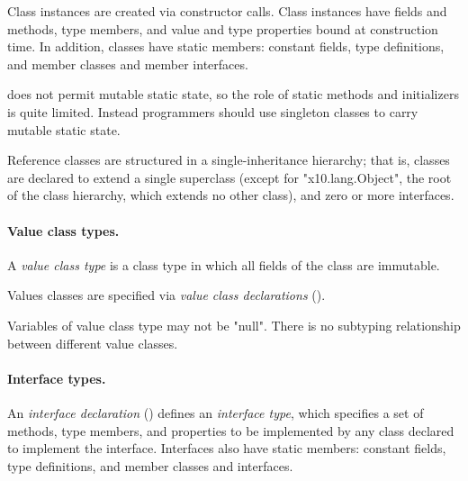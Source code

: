         Class instances are created via
        constructor calls.  Class instances have fields and
        methods, type members, and value and type properties bound at
        construction time.  In addition, classes have static
        members: constant fields, type definitions, and member
        classes and member interfaces.

\Xten{} does
not
permit mutable static state, so the role of static methods and
initializers is quite limited. Instead programmers should use
singleton classes to carry mutable static state.
        
        Reference classes are structured in a
        single-inheritance hierarchy; that is,
        classes are declared to extend a single
        superclass (except for \xcd"x10.lang.Object", the root
        of the class hierarchy, which extends no other class),
        and zero or more interfaces.

\paragraph{Value class types.}


A {\em value class type}
is a class type in which all fields of the class are immutable.

Values classes are specified via {\em value class declarations}
().

Variables of value class type may not be \xcd"null".
There is no subtyping relationship between different value
classes.

\paragraph{Interface types.}


        An {\em interface declaration} ()
        defines an {\em interface type}, which specifies a set of
        methods, type members, and properties to be implemented by any class
        declared to implement the interface.  Interfaces also
        have static members: constant fields, type definitions,
        and member classes and interfaces.

